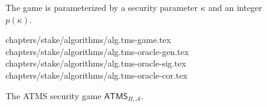 \begin{figure}
  \begin{algorithm}[H]
    The game is parameterized by a security parameter $\kappa$ and an
    integer $p(\kappa)$.
    \caption{\label{alg.tms-game}The game $\textsf{ATMS}_{\Pi,\mathcal{A}}$}

    \begin{algorithmic}[1]
      {chapters/stake/algorithms/alg.tms-game.tex}
      {chapters/stake/algorithms/alg.tms-oracle-gen.tex}
      {chapters/stake/algorithms/alg.tms-oracle-sig.tex}
      {chapters/stake/algorithms/alg.tms-oracle-cor.tex}
    \end{algorithmic}
  \end{algorithm}
  \caption{The ATMS security game $\textsf{ATMS}_{\Pi,\mathcal{A}}$.}
  \label{fig:ATMS-game}
\end{figure}
